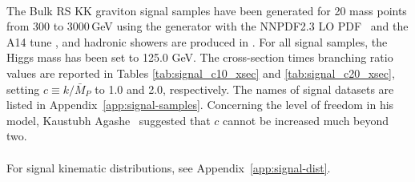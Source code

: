 \paragraph{}
The Bulk RS KK graviton signal samples have been generated for 20 mass points from 300 to 3000\,GeV using the \Madgraph generator\cite{MG5aMCatNLO} with the NNPDF2.3 LO PDF~\cite{Ball:2012cx} and the A14 tune \cite{ATL-PHYS-PUB-2014-021}, and hadronic showers are produced in .  For all signal samples, the Higgs mass has been set to 125.0 GeV. The cross-section times branching ratio values are reported in Tables \ref{tab:signal_c10_xsec} and \ref{tab:signal_c20_xsec}, setting $c \equiv k/\bar{M}_P$ to 1.0 and 2.0, respectively.  The names of signal datasets are listed in Appendix~\ref{app:signal-samples}. Concerning the level of freedom in his model, Kaustubh Agashe~\cite{Agashe} suggested that $c$ cannot be increased much beyond two.

\paragraph{}
For signal kinematic distributions, see Appendix~\ref{app:signal-dist}.

